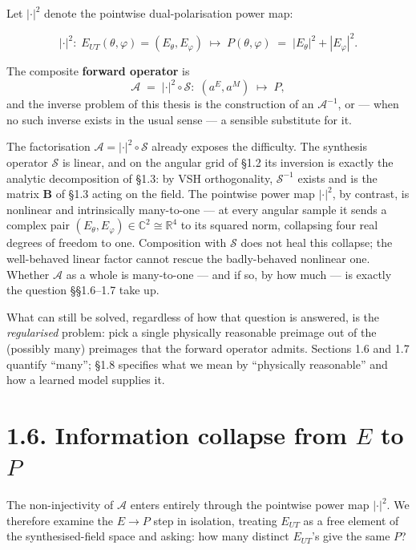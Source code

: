 \documentclass[
  english,
  11pt,
]{report}
\begin{document}
Let \(|\cdot|^2\) denote the pointwise dual-polarisation power map:

\[
|\cdot|^2: \;E_{UT}(\theta,\varphi) = (E_\theta, E_\varphi)\;\longmapsto\;P(\theta,\varphi) \;=\; |E_\theta|^2 + |E_\varphi|^2.
\]

The composite \textbf{forward operator} is \[
\mathcal{A} \;=\; |\cdot|^2 \circ \mathcal{S}\colon \;(a^E, a^M)\;\longmapsto\;P,
\] and the inverse problem of this thesis is the construction of an
\(\mathcal{A}^{-1}\), or --- when no such inverse exists in the usual
sense --- a sensible substitute for it.

The factorisation \(\mathcal{A} = |\cdot|^2 \circ \mathcal{S}\) already
exposes the difficulty. The synthesis operator \(\mathcal{S}\) is
linear, and on the angular grid of §1.2 its inversion is exactly the
analytic decomposition of §1.3: by VSH orthogonality,
\(\mathcal{S}^{-1}\) exists and is the matrix \(\mathbf B\) of §1.3
acting on the field. The pointwise power map \(|\cdot|^2\), by contrast,
is nonlinear and intrinsically many-to-one --- at every angular sample
it sends a complex pair
\((E_\theta, E_\varphi)\in\mathbb{C}^2 \cong \mathbb R^4\) to its
squared norm, collapsing four real degrees of freedom to one.
Composition with \(\mathcal{S}\) does not heal this collapse; the
well-behaved linear factor cannot rescue the badly-behaved nonlinear
one. Whether \(\mathcal{A}\) as a whole is many-to-one --- and if so, by
how much --- is exactly the question §§1.6--1.7 take up.

What can still be solved, regardless of how that question is answered,
is the \emph{regularised} problem: pick a single physically reasonable
preimage out of the (possibly many) preimages that the forward operator
admits. Sections 1.6 and 1.7 quantify ``many''; §1.8 specifies what we
mean by ``physically reasonable'' and how a learned model supplies it.

\section{\texorpdfstring{1.6. Information collapse from \(E\) to
\(P\)}{1.6. Information collapse from E to P}}\label{information-collapse-from-e-to-p}

The non-injectivity of \(\mathcal{A}\) enters entirely through the
pointwise power map \(|\cdot|^2\). We therefore examine the \(E\to P\)
step in isolation, treating \(E_{UT}\) as a free element of the
synthesised-field space and asking: how many distinct \(E_{UT}\)'s give
the same \(P\)?
\end{document}
